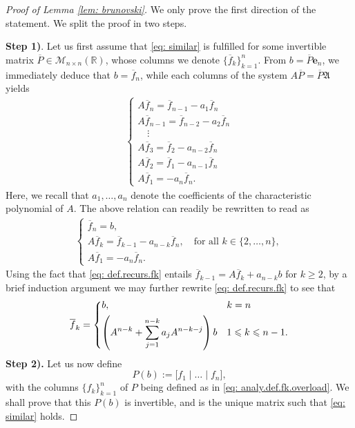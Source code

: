 \documentclass[journal,twoside,web]{ieeecolor}
\newcommand{\R}{\mathbb{R}}
\begin{document}
	\begin{proof}[Proof of Lemma \ref{lem: brunovski}] We only prove the first direction of the statement. 
	We split the proof in two steps.
\smallskip

\noindent \textbf{Step 1)}. Let us first assume that \eqref{eq: similar} is fulfilled for some invertible matrix $\overline{P}\in\mathcal{M}_{n\times n}(\R)$, whose columns we denote $\{\overline{f}_k\}_{k=1}^n$. 
From $b=\overline{P}\mathbf{e}_n$, we immediately deduce that $b = \overline{f}_n$, while each columns of the system $A\overline{P} = \overline{P}\mathfrak{A}$ yields 
\begin{align}
\begin{cases}
A \overline{f}_n = \overline{f}_{n-1} - a_{1}\overline{f}_n \\
A \overline{f}_{n-1} = \overline{f}_{n-2} - a_{2}\overline{f}_{n} \\
\quad \vdots\\
A \overline{f}_3 = \overline{f}_2 - a_{n-2} \overline{f}_n\\
A \overline{f}_2 = \overline{f}_1 - a_{n-1}\overline{f}_n\\
A \overline{f}_1 = -a_n \overline{f}_n.
\end{cases}
\end{align}
Here, we recall that $a_1, \ldots, a_n$ denote the coefficients of the characteristic polynomial of $A$.
The above relation can readily be rewritten to read as
\begin{align} \label{eq: def.recurs.fk}
\begin{cases}
\overline{f}_n = b,\\
A\overline{f}_{k} = \overline{f}_{k-1} - a_{n-k}\overline{f}_n, \quad \text{for all }k \in \{2, \ldots, n\},\\
A\overline{f}_1 = -a_n\overline{f}_n.
\end{cases}
\end{align}
Using the fact that \eqref{eq: def.recurs.fk} entails $\overline{f}_{k-1} = A\overline{f}_{k} + a_{n-k}b$ for $k\geqslant2$, by a brief induction argument we may further rewrite \eqref{eq: def.recurs.fk} to see that
\begin{equation} \label{eq: analy.def.fk.overload}
\overline{f}_k =
	\begin{dcases}
	b, &k=n \\
	\left(A^{n-k} + \sum_{j=1}^{n-k} a_{j} A^{n-k-j}\right) b &1\leqslant k \leqslant n-1.
	\end{dcases}
	\end{equation}
\textbf{Step 2).} Let us now define 
\begin{equation} \label{eq: P.def.proof}
P(b):= \Big[f_1 \mid \ldots \mid f_n\Big],
\end{equation}
with the columns $\{f_k\}_{k=1}^n$ of $P$ being defined as in \eqref{eq: analy.def.fk.overload}. We shall prove that this $P(b)$ is invertible, and is the unique matrix such that \eqref{eq: similar} holds.


\end{proof}
\end{document}
